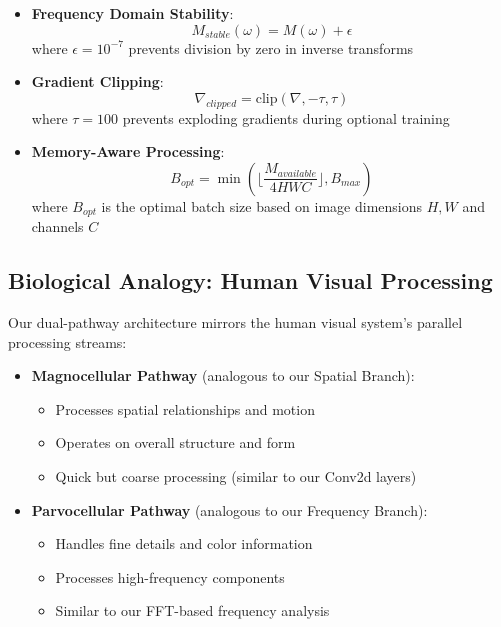 \documentclass{article}
\begin{document}
\begin{itemize}
    \item \textbf{Frequency Domain Stability}:
    \begin{equation}
        M_{stable}(\omega) = M(\omega) + \epsilon
    \end{equation}
    where $\epsilon = 10^{-7}$ prevents division by zero in inverse transforms
    
    \item \textbf{Gradient Clipping}:
    \begin{equation}
        \nabla_{clipped} = \text{clip}(\nabla, -\tau, \tau)
    \end{equation}
    where $\tau = 100$ prevents exploding gradients during optional training
    
    \item \textbf{Memory-Aware Processing}:
    \begin{equation}
        B_{opt} = \min(\lfloor \frac{M_{available}}{4HWC} \rfloor, B_{max})
    \end{equation}
    where $B_{opt}$ is the optimal batch size based on image dimensions $H,W$ and channels $C$
\end{itemize}

\subsection{Biological Analogy: Human Visual Processing}
Our dual-pathway architecture mirrors the human visual system's parallel processing streams:

\begin{itemize}
\item \textbf{Magnocellular Pathway} (analogous to our Spatial Branch):
    \begin{itemize}
        \item Processes spatial relationships and motion
        \item Operates on overall structure and form
        \item Quick but coarse processing (similar to our Conv2d layers)
    \end{itemize}
    
\item \textbf{Parvocellular Pathway} (analogous to our Frequency Branch):
    \begin{itemize}
        \item Handles fine details and color information
        \item Processes high-frequency components
        \item Similar to our FFT-based frequency analysis
    \end{itemize}
\end{itemize}
\end{document}
